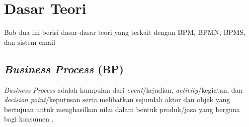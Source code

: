 \chapter{Dasar Teori}
\label{chap:teori}

Bab dua ini berisi dasar-dasar teori yang terkait dengan BPM, BPMN, BPMS, dan sistem email

\section{\textit{Business Process} (BP)}
\label{sec:bp}
\textit{Business Process} adalah kumpulan dari \textit{event}/kejadian, \textit{activity}/kegiatan, dan \textit{decision point}/keputusan serta melibatkan sejumlah aktor dan objek yang bertujuan untuk menghasilkan nilai dalam bentuk produk/jasa yang berguna bagi konsumen\cite{dumas:13} .

